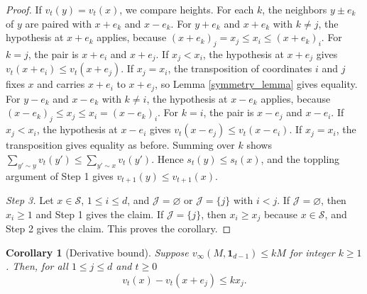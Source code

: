\documentclass[12pt]{amsart}
\newtheorem{corollary}{Corollary}[section]
\begin{document}
\begin{proof}
If $v_t(y)=v_t(x)$, we compare heights. For each $k$, the neighbors $y\pm e_k$ of $y$ are paired with $x+e_k$ and $x-e_k$. For $y+e_k$ and $x+e_k$ with $k\neq j$, the hypothesis at $x+e_k$ applies, because $(x+e_k)_j=x_j\leq x_i\leq(x+e_k)_i$. For $k=j$, the pair is $x+e_i$ and $x+e_j$. If $x_j<x_i$, the hypothesis at $x+e_j$ gives $v_t(x+e_i)\leq v_t(x+e_j)$. If $x_j=x_i$, the transposition of coordinates $i$ and $j$ fixes $x$ and carries $x+e_i$ to $x+e_j$, so Lemma \ref{symmetry_lemma} gives equality. For $y-e_k$ and $x-e_k$ with $k\neq i$, the hypothesis at $x-e_k$ applies, because $(x-e_k)_j\leq x_j\leq x_i=(x-e_k)_i$. For $k=i$, the pair is $x-e_j$ and $x-e_i$. If $x_j<x_i$, the hypothesis at $x-e_i$ gives $v_t(x-e_j)\leq v_t(x-e_i)$. If $x_j=x_i$, the transposition gives equality as before. Summing over $k$ shows $\sum_{y'\sim y}v_t(y')\leq\sum_{y'\sim x}v_t(y')$. Hence $s_t(y)\leq s_t(x)$, and the toppling argument of Step 1 gives $v_{t+1}(y)\leq v_{t+1}(x)$.

\emph{Step 3.} Let $x\in\mathcal S$, $1\leq i\leq d$, and $\mathcal J=\varnothing$ or $\mathcal J=\{j\}$ with $i<j$. If $\mathcal J=\varnothing$, then $x_i\geq1$ and Step 1 gives the claim. If $\mathcal J=\{j\}$, then $x_i\geq x_j$ because $x\in\mathcal S$, and Step 2 gives the claim. This proves the corollary.
    \end{proof}
		\begin{corollary}[Derivative bound] \label{cor:derivative_bound}
		Suppose $v_{\infty}(M, \mathbf{1}_{d-1}) \leq k M$ for integer $k \geq 1$. 
		Then, for all $1 \leq j \leq d$ and $t \geq 0$
		\begin{equation} \label{eq:cor:derivative_bound}
		v_t(x) - v_t(x+e_j) \leq k x_j.
		\end{equation}

	\end{corollary}
	
\end{document}

